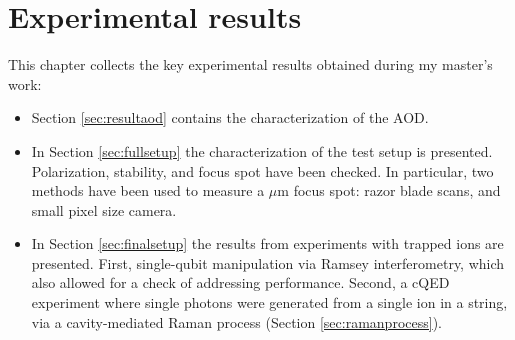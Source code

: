 
\chapter{Experimental results}
\label{ch:results}
This chapter collects the key experimental results obtained during my master's work:
\begin{itemize}
\item Section \ref{sec:resultaod} contains the characterization of the AOD.
\item In Section \ref{sec:fullsetup} the characterization of the test setup is presented. Polarization, stability, and focus spot have been checked. In particular, two methods have been used to measure a $\mu$m focus spot: razor blade scans, and small pixel size camera.
\item In Section \ref{sec:finalsetup} the results from experiments with trapped ions are presented. First, single-qubit manipulation via Ramsey interferometry, which also allowed for a check of addressing performance. Second, a cQED experiment where single photons were generated from a single ion in a string, via a cavity-mediated Raman process (Section \ref{sec:ramanprocess}).
\end{itemize}
